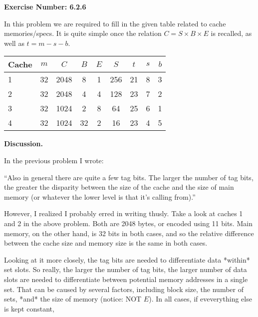 \documentclass{article}
\begin{document}
\noindent \textbf{Exercise Number: 6.2.6}  %

\medskip 

\noindent In this problem we are required to fill in the given table related to
cache memories/specs. It is quite simple once the relation $C = S \times B \times E$ is recalled, as well as $t = m - s - b$.

\bigskip

\begin{center}
  \begin{tabular}{l*{7}{c}r}
    Cache &   $m$   &   $C$   &  $B$ &   $E$  &   $S$   &   $t$   &  $s$  &   $b$   \\ \hline

    1     &   32    &   2048  &  8   &    1   &   256   &   21   &   8  &   3  \\

    2     &   32    &   2048  &  4   &   4    &   128   &   23    &   7   &  2    \\

    3     &   32    &   1024  &  2   &   8    &  64     &   25    &   6   &  1    \\

    4     &   32    &   1024  &  32    &   2  &  16      &   23    &   4   &  5    \\

  \end{tabular}
\end{center}

\bigskip

\bigskip

\noindent \textbf{Discussion.}

\medskip

\noindent In the previous problem I wrote: 

\medskip

``Also in general there are quite a few tag bits. The larger the number of tag bits, the greater
the disparity between the size of the cache and the size of main memory (or whatever the lower
level is that it's calling from).''

\medskip

However, I realized I probably erred in writing thusly. Take a look at caches 1 and 2 in the above problem. Both are 2048 bytes, or encoded using 11 bits. Main memory, on the other hand, is 32 bits
in both cases, and so the relative difference between the cache size and memory size is the same in both cases. 

Looking at it more closely, the tag bits are needed to differentiate data *within* set slots. So really, the larger the number of tag bits, the larger number of data slots are needed to differentiate between potential memory addresses in a single set. That can be caused by several factors, including block size, the number of sets, *and* the size of memory (notice: NOT $E$). In all cases, if eveverything else is kept constant, 
\end{document}
